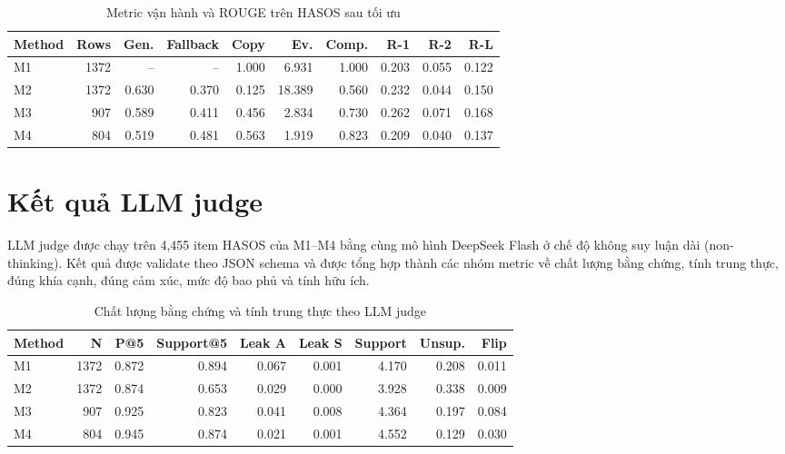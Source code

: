 \begin{table}[H]
\centering
\caption{Metric vận hành và ROUGE trên HASOS sau tối ưu}
\label{tab:hasos-production-rouge}
\small
\begin{tabular}{l r r r r r r r r r}
\toprule
\textbf{Method} & \textbf{Rows} & \textbf{Gen.} & \textbf{Fallback} & \textbf{Copy} & \textbf{Ev.} & \textbf{Comp.} & \textbf{R-1} & \textbf{R-2} & \textbf{R-L} \\
\midrule
M1 & 1372 & -- & -- & 1.000 & 6.931 & 1.000 & 0.203 & 0.055 & 0.122 \\
M2 & 1372 & 0.630 & 0.370 & 0.125 & 18.389 & 0.560 & 0.232 & 0.044 & 0.150 \\
M3 &  907 & 0.589 & 0.411 & 0.456 &  2.834 & 0.730 & 0.262 & 0.071 & 0.168 \\
M4 &  804 & 0.519 & 0.481 & 0.563 &  1.919 & 0.823 & 0.209 & 0.040 & 0.137 \\
\bottomrule
\end{tabular}
\end{table}

\section{Kết quả LLM judge}

LLM judge được chạy trên 4,455 item HASOS của M1--M4 bằng cùng mô hình DeepSeek Flash ở chế độ không suy luận dài (non-thinking). Kết quả được validate theo JSON schema và được tổng hợp thành các nhóm metric về chất lượng bằng chứng, tính trung thực, đúng khía cạnh, đúng cảm xúc, mức độ bao phủ và tính hữu ích.

\begin{table}[H]
\centering
\caption{Chất lượng bằng chứng và tính trung thực theo LLM judge}
\label{tab:evidence-faithfulness}
\small
\begin{tabular}{l r r r r r r r r}
\toprule
\textbf{Method} & \textbf{N} & \textbf{P@5} & \textbf{Support@5} & \textbf{Leak A} & \textbf{Leak S} & \textbf{Support} & \textbf{Unsup.} & \textbf{Flip} \\
\midrule
M1 & 1372 & 0.872 & 0.894 & 0.067 & 0.001 & 4.170 & 0.208 & 0.011 \\
M2 & 1372 & 0.874 & 0.653 & 0.029 & 0.000 & 3.928 & 0.338 & 0.009 \\
M3 &  907 & 0.925 & 0.823 & 0.041 & 0.008 & 4.364 & 0.197 & 0.084 \\
M4 &  804 & 0.945 & 0.874 & 0.021 & 0.001 & 4.552 & 0.129 & 0.030 \\
\bottomrule
\end{tabular}
\end{table}

